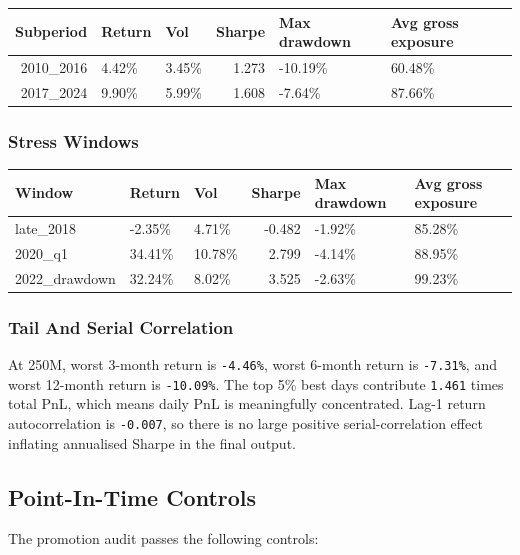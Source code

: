 \documentclass[
  10pt,
]{article}
\begin{document}
\begin{longtable}[]{@{}rllrll@{}}
\toprule
Subperiod & Return & Vol & Sharpe & Max drawdown & Avg gross exposure \\
\midrule
\endhead
2010\_2016 & 4.42\% & 3.45\% & 1.273 & -10.19\% & 60.48\% \\
2017\_2024 & 9.90\% & 5.99\% & 1.608 & -7.64\% & 87.66\% \\
\bottomrule
\end{longtable}

\hypertarget{stress-windows}{%
\subsubsection{Stress Windows}\label{stress-windows}}

\begin{longtable}[]{@{}lllrll@{}}
\toprule
Window & Return & Vol & Sharpe & Max drawdown & Avg gross exposure \\
\midrule
\endhead
late\_2018 & -2.35\% & 4.71\% & -0.482 & -1.92\% & 85.28\% \\
2020\_q1 & 34.41\% & 10.78\% & 2.799 & -4.14\% & 88.95\% \\
2022\_drawdown & 32.24\% & 8.02\% & 3.525 & -2.63\% & 99.23\% \\
\bottomrule
\end{longtable}

\hypertarget{tail-and-serial-correlation}{%
\subsubsection{Tail And Serial
Correlation}\label{tail-and-serial-correlation}}

At 250M, worst 3-month return is \texttt{-4.46\%}, worst 6-month return
is \texttt{-7.31\%}, and worst 12-month return is \texttt{-10.09\%}. The
top 5\% best days contribute \texttt{1.461} times total PnL, which means
daily PnL is meaningfully concentrated. Lag-1 return autocorrelation is
\texttt{-0.007}, so there is no large positive serial-correlation effect
inflating annualised Sharpe in the final output.

\hypertarget{point-in-time-controls}{%
\subsection{Point-In-Time Controls}\label{point-in-time-controls}}

The promotion audit passes the following controls:
\end{document}
